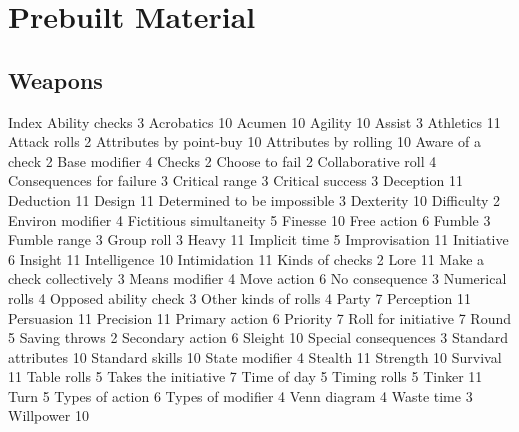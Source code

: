 \documentclass[letterpaper,titlepage,openany,twocolumn]{book}
\begin{document}
\appendix

\chapter{Prebuilt Material}

\section{Weapons}

\backmatter



Index
Ability checks	3
Acrobatics	10
Acumen	10
Agility	10
Assist	3
Athletics	11
Attack rolls	2
Attributes by point-buy	10
Attributes by rolling	10
Aware of a check	2
Base modifier	4
Checks	2
Choose to fail	2
Collaborative roll	4
Consequences for failure	3
Critical range	3
Critical success	3
Deception	11
Deduction	11
Design	11
Determined to be impossible	3
Dexterity	10
Difficulty	2
Environ modifier	4
Fictitious simultaneity	5
Finesse	10
Free action	6
Fumble	3
Fumble range	3
Group roll	3
Heavy	11
Implicit time	5
Improvisation	11
Initiative	6
Insight	11
Intelligence	10
Intimidation	11
Kinds of checks	2
Lore	11
Make a check collectively	3
Means modifier	4
Move action	6
No consequence	3
Numerical rolls	4
Opposed ability check	3
Other kinds of rolls	4
Party	7
Perception	11
Persuasion	11
Precision	11
Primary action	6
Priority	7
Roll for initiative	7
Round	5
Saving throws	2
Secondary action	6
Sleight	10
Special consequences	3
Standard attributes	10
Standard skills	10
State modifier	4
Stealth	11
Strength	10
Survival	11
Table rolls	5
Takes the initiative	7
Time of day	5
Timing rolls	5
Tinker	11
Turn	5
Types of action	6
Types of modifier	4
Venn diagram	4
Waste time	3
Willpower	10
\end{document}
